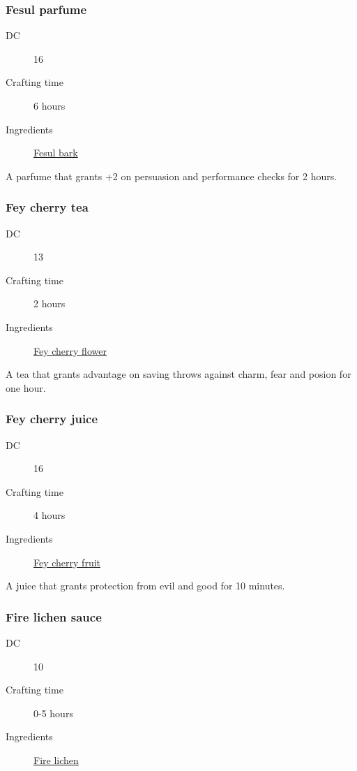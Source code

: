 \subsubsection{Fesul parfume}
\label{Fesul parfume}

\begin{description}
\item [DC] 16
\item [Crafting time] 6 hours
\item [Ingredients] \hyperref[Fesul]{Fesul bark}
\end{description}

A parfume that grants +2 on persuasion and performance checks for 2 hours.

\subsubsection{Fey cherry tea}
\label{Fey cherry tea}

\begin{description}
\item [DC] 13
\item [Crafting time] 2 hours
\item [Ingredients] \hyperref[Fey cherry]{Fey cherry flower}
\end{description}

A tea that grants advantage on saving throws against charm, fear and posion for one hour. 

\subsubsection{Fey cherry juice}
\label{Fey cherry juice}

\begin{description}
\item [DC] 16
\item [Crafting time] 4 hours
\item [Ingredients] \hyperref[Fey cherry]{Fey cherry fruit}
\end{description}

A juice that grants protection from evil and good for 10 minutes.

\subsubsection{Fire lichen sauce}
\label{Fire lichen sauce}

\begin{description}
\item [DC] 10
\item [Crafting time] 0-5 hours
\item [Ingredients] \hyperref[Fire lichen]{Fire lichen}
\end{description}

